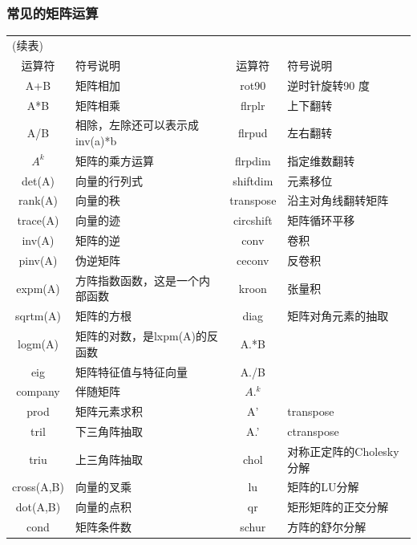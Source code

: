         \subsubsection{常见的矩阵运算}
            \begin{longtable}{|c|l|c|l|}
            \hline
            \endfirsthead
            \multicolumn{4}{l}{(续表)}
            \endhead
            \hline
            \multicolumn{4}{c}{\itshape 接下页表格……}\\
            \endfoot
            \hline
            \endlastfoot
                \toprule
                 运算符 &  符号说明&运算符 &  符号说明\\
                \midrule
            A+B  &矩阵相加& rot90 &逆时针旋转90 度\\
            A*B &矩阵相乘 &flrplr &上下翻转\\
            A/B& 相除，左除还可以表示成inv(a)*b &flrpud  &左右翻转\\
            $A^k  $&矩阵的乘方运算 &flrpdim  &指定维数翻转\\
            det(A)  &向量的行列式 &shiftdim &元素移位\\
            rank(A) &向量的秩&  transpose &沿主对角线翻转矩阵\\
            trace(A)  &向量的迹 &circshift  &矩阵循环平移\\
            inv(A)  &矩阵的逆&  conv& 卷积\\
            pinv(A) &伪逆矩阵 &ceconv &反卷积\\
            expm(A) &方阵指数函数，这是一个内部函数  &kroon  &张量积\\
            sqrtm(A)  &矩阵的方根  &diag  &矩阵对角元素的抽取\\
            logm(A) &矩阵的对数，是lxpm(A)的反函数  &A.*B &{}\\
            eig &矩阵特征值与特征向量 &A./B &{}\\
            company &伴随矩阵&  $A.^k $&{}\\
            prod  &矩阵元素求积&  A’& transpose\\
            tril  &下三角阵抽取&  A.’ &ctranspose\\
            triu  &上三角阵抽取&  chol& 对称正定阵的Cholesky分解\\
            cross(A,B)  &向量的叉乘& lu& 矩阵的LU分解\\
            dot(A,B)  &向量的点积  &qr&  矩形矩阵的正交分解\\
            cond  &矩阵条件数  &schur  &方阵的舒尔分解\\

\end{longtable}
